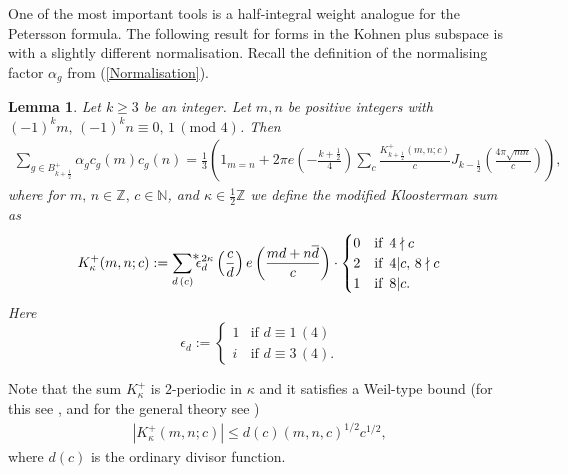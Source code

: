 \documentclass[a4paper,10pt,twoside]{amsart}
\newtheorem{lemma}[theorem]{Lemma}
\theoremstyle{definition}
\numberwithin{equation}{section}
\newcommand\Z{\mathbb{Z}}
\newcommand\N{\mathbb{N}}
\renewcommand\:{\colon}
\newcommand{\sump}{\mathop{{\sum}^{\raisebox{-3pt}{\makebox[0pt][l]{$*$}}}}}
\begin{document}

\noindent One of the most important tools is a half-integral weight analogue for the Petersson formula. The following result for forms in the Kohnen plus subspace is \cite[Lemma 6]{Blomer-Corbett2022} with a slightly different normalisation. Recall the definition of the normalising factor $\alpha_g$ from (\ref{Normalisation}). 

\begin{lemma}\label{half-int-Petersson}
Let $k\geq 3$ be an integer. Let $m,n$ be positive integers with $(-1)^km,\,(-1)^kn\equiv 0,\,1\,(\text{mod }4)$. Then 
\begin{align*}
\sum_{g\in B_{k+\frac12}^+}\alpha_g c_g(m)c_g(n)=\frac13\left(1_{m=n}+2\pi e\left(-\frac{k+\frac12}4\right)\sum_c\frac{K_{k+\frac12}^+(m,n;c)}c J_{k-\frac12}\left(\frac{4\pi\sqrt{mn}}c\right)\right),
\end{align*} 
where for $m,\,n\in\Z,\,c\in\N$, and $\kappa\in\frac12\Z$ we define the modified Kloosterman sum as
\begin{align*}
K_\kappa^+(m,n;c):=\sump_{d\,(c)}\epsilon_d^{2\kappa}\left(\frac cd\right)e\left(\frac{md+n\overline d}c\right)\cdot\begin{cases}
0 & \text{if }\, 4\nmid c \\
2 & \text{if }\, 4|c,\,8\nmid c \\
1 & \text{if }\, 8|c.
\end{cases} 
\end{align*}
Here 
\[
\epsilon_d:=\begin{cases}
1 & \text{if }d\equiv 1\,(4) \\
i & \text{if }d\equiv 3\,(4).
\end{cases}
\]
\end{lemma}

\noindent Note that the sum $K_\kappa^+$ is $2$-periodic in $\kappa$ and it satisfies a Weil-type bound (for this see \cite{Waibel2018}, and for the general theory see \cite[Chapter 11]{Iwaniec-Kowalski2004})
\begin{align}\label{modified-Kloosterman-bound}
|K_\kappa^+(m,n;c)|\leq d(c)(m,n,c)^{1/2}c^{1/2},
\end{align}
where $d(c)$ is the ordinary divisor function. 
\end{document}
